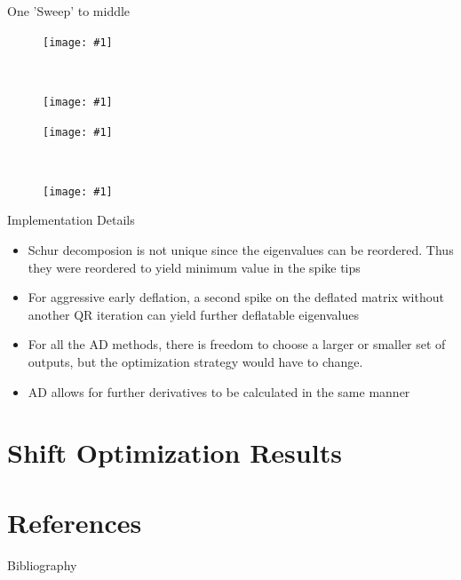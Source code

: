 \documentclass[12pt]{beamer}
\newcommand{\pic}[1]{\texttt{[image: \#1]}}
\begin{document}
  \begin{frame}{One 'Sweep' to middle}
    \vspace*{-.8cm}
    \begin{figure}[h!]
      \centering
      \begin{minipage}[t]{.5\linewidth}
        \centering
        \pic{midDef1}
      \end{minipage}~
      \begin{minipage}[t]{.5\linewidth}
        \centering
        \pic{midDef2}
      \end{minipage}

      \begin{minipage}[b]{.5\linewidth}
        \centering
        \pic{midDef3}
      \end{minipage}~
      \begin{minipage}[b]{.5\linewidth}
        \centering
        \pic{midDef4}
      \end{minipage}%
    \end{figure}
  \end{frame}

  \begin{frame}{Implementation Details}
    \begin{itemize}
      \item Schur decomposion is not unique since the eigenvalues can be reordered.
        Thus they were reordered to yield minimum value in the spike tips
      \item For aggressive early deflation, a second spike on the deflated matrix
        without another QR iteration can yield further deflatable eigenvalues \cite{}
      \item For all the AD methods, there is freedom to choose a larger or smaller set of
        outputs, but the optimization strategy would have to change.
      \item AD allows for further derivatives to be calculated in the same manner
    \end{itemize}
  \end{frame}

	\section{Shift Optimization Results}
	\begin{frame}{}
	\end{frame}
	
	\section{References}
	\nocite{*}
	\begin{frame}{Bibliography}
		
		
	\end{frame}
	
\end{document}
